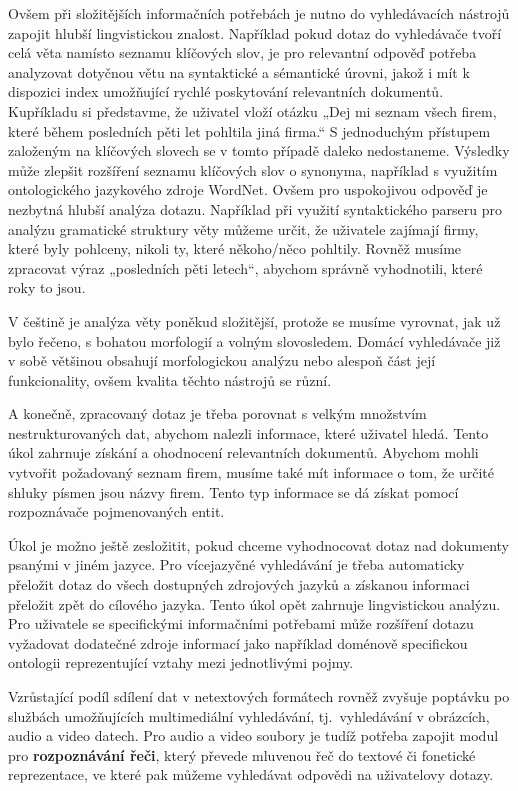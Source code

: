 \begin{multicols}{2}
Ovšem při složitějších informačních potřebách je nutno do vyhledávacích nástrojů zapojit hlubší lingvistickou znalost. Například pokud dotaz do vyhledávače tvoří celá věta namísto seznamu klíčových slov, je pro relevantní odpověď potřeba analyzovat dotyčnou větu na syntaktické a sémantické úrovni, jakož i mít k dispozici index umožňující rychlé poskytování relevantních dokumentů.
Kupříkladu si představme, že uživatel vloží otázku „Dej mi seznam všech firem, které během posledních pěti let pohltila jiná firma.“ S jednoduchým přístupem založeným na klíčových slovech se v tomto případě daleko nedostaneme. Výsledky může zlepšit rozšíření seznamu klíčových slov o synonyma, například s využitím ontologického jazykového zdroje WordNet. Ovšem pro uspokojivou odpověď je nezbytná hlubší analýza dotazu. Například při využití syntaktického parseru pro analýzu gramatické struktury věty můžeme určit, že uživatele zajímají firmy, které byly pohlceny, nikoli ty, které někoho/něco pohltily. Rovněž musíme zpracovat výraz „posledních pěti letech“, abychom správně vyhodnotili, které roky to jsou.

V češtině je analýza věty poněkud složitější, protože se musíme vyrovnat, jak už bylo řečeno, s bohatou morfologií a volným slovosledem. Domácí vyhledávače již v sobě většinou obsahují morfologickou analýzu nebo alespoň část její funkcionality, ovšem kvalita těchto nástrojů se různí.

A konečně, zpracovaný dotaz je třeba porovnat s velkým množstvím nestrukturovaných dat, abychom nalezli informace, které uživatel hledá. Tento úkol zahrnuje získání a ohodnocení relevantních dokumentů. Abychom mohli vytvořit požadovaný seznam firem, musíme také mít informace o tom, že určité shluky písmen jsou názvy firem. Tento typ informace se dá získat pomocí rozpoznávače pojmenovaných entit.

Úkol je možno ještě zesložitit, pokud chceme vyhodnocovat dotaz nad dokumenty psanými v jiném jazyce. Pro vícejazyčné vyhledávání je třeba automaticky přeložit dotaz do všech dostupných zdrojových jazyků a získanou informaci přeložit zpět do cílového jazyka. Tento úkol opět zahrnuje lingvistickou analýzu. Pro uživatele se specifickými informačními potřebami může rozšíření dotazu vyžadovat dodatečné zdroje informací jako například doménově specifickou ontologii reprezentující vztahy mezi jednotlivými pojmy.

Vzrůstající podíl sdílení dat v netextových formátech rovněž zvyšuje poptávku po službách umožňujících multimediální vyhledávání, tj.~vyhledávání v obrázcích, audio a video datech. Pro audio a video soubory je tudíž potřeba zapojit modul pro \textbf{rozpoznávání řeči}, který převede mluvenou řeč do textové či fonetické reprezentace, ve které pak můžeme vyhledávat odpovědi na uživatelovy dotazy.


\end{multicols}
